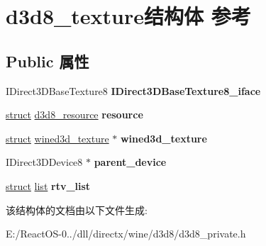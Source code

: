 \hypertarget{structd3d8__texture}{}\section{d3d8\+\_\+texture结构体 参考}
\label{structd3d8__texture}
\subsection*{Public 属性}
\begin{DoxyCompactItemize}
\item 
\mbox{\label{structd3d8__texture_a8739a7393e112996ab94d5d735c5f83b}} 
I\+Direct3\+D\+Base\+Texture8 {\bfseries I\+Direct3\+D\+Base\+Texture8\+\_\+iface}
\item 
\mbox{\label{structd3d8__texture_abf4bc0369cae2f6883939e566103e83b}} 
\hyperlink{interfacestruct}{struct} \hyperlink{structd3d8__resource}{d3d8\+\_\+resource} {\bfseries resource}
\item 
\mbox{\label{structd3d8__texture_a505e9b127ab5b1f6414d610b4af3270e}} 
\hyperlink{interfacestruct}{struct} \hyperlink{structwined3d__texture}{wined3d\+\_\+texture} $\ast$ {\bfseries wined3d\+\_\+texture}
\item 
\mbox{\label{structd3d8__texture_a2d41e47f5faba71d61537a08acce8e26}} 
I\+Direct3\+D\+Device8 $\ast$ {\bfseries parent\+\_\+device}
\item 
\mbox{\label{structd3d8__texture_aecd52c558ae91d602aa605ed69658131}} 
\hyperlink{interfacestruct}{struct} \hyperlink{classlist}{list} {\bfseries rtv\+\_\+list}
\end{DoxyCompactItemize}


该结构体的文档由以下文件生成\+:\begin{DoxyCompactItemize}
\item 
E\+:/\+React\+O\+S-\/0../dll/directx/wine/d3d8/d3d8\+\_\+private.\+h\end{DoxyCompactItemize}
